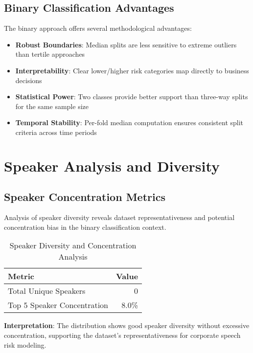 \documentclass[11pt,a4paper]{article}
\begin{document}
\subsection{Binary Classification Advantages}

The binary approach offers several methodological advantages:

\begin{itemize}
\item \textbf{Robust Boundaries}: Median splits are less sensitive to extreme outliers than tertile approaches
\item \textbf{Interpretability}: Clear lower/higher risk categories map directly to business decisions
\item \textbf{Statistical Power}: Two classes provide better support than three-way splits for the same sample size
\item \textbf{Temporal Stability}: Per-fold median computation ensures consistent split criteria across time periods
\end{itemize}



\section{Speaker Analysis and Diversity}

\subsection{Speaker Concentration Metrics}

Analysis of speaker diversity reveals dataset representativeness and potential concentration bias in the binary classification context.

\begin{table}[H]
\centering
\caption{Speaker Diversity and Concentration Analysis}
\begin{tabular}{lr}
\toprule
\textbf{Metric} & \textbf{Value} \\
\midrule
Total Unique Speakers & 0 \\
Top 5 Speaker Concentration & 8.0\% \\
\bottomrule
\end{tabular}
\end{table}

\textbf{Interpretation}: The distribution shows good speaker diversity without excessive concentration, supporting the dataset's representativeness for corporate speech risk modeling.
\end{document}
